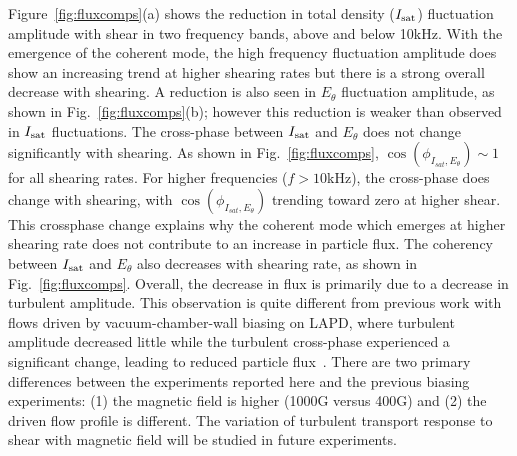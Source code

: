 \documentclass[aps,prl,amsmath,amssymb,preprint,superscriptaddress]{revtex4}
\begin{document}
Figure~\ref{fig:fluxcomps}(a) shows the reduction in total density ($I_{\rm
  sat}$) fluctuation amplitude with shear in two frequency bands,
above and below 10kHz.  With the emergence of the coherent mode, the
high frequency fluctuation amplitude does show an increasing trend at higher shearing
rates but there is a strong overall decrease with shearing.
A reduction is also seen in $E_\theta$ fluctuation amplitude, as shown in
Fig.~\ref{fig:fluxcomps}(b); however this reduction is weaker than
observed in $I_{\rm sat}$ fluctuations.  The cross-phase between
$I_{\rm sat}$ and $E_\theta$ does not change significantly with
shearing. As shown in Fig.~\ref{fig:fluxcomps},
$\cos(\phi_{I_{sat},E_\theta}) \sim 1$ for all shearing rates.  For
higher frequencies ($f > 10$kHz), the cross-phase does change with
shearing, with $\cos(\phi_{I_{sat},E_\theta})$ trending toward zero at
higher shear.  This crossphase change explains why the coherent mode
which emerges at higher shearing rate does not contribute to an
increase in particle flux.  The coherency between $I_{\rm sat}$ and
$E_\theta$ also decreases with shearing rate, as shown in 
Fig.~\ref{fig:fluxcomps}.  Overall, the decrease in flux is primarily
due to a decrease in turbulent amplitude.  This observation is quite
different from previous work with flows driven by vacuum-chamber-wall
biasing on LAPD, where turbulent amplitude decreased little while the
turbulent cross-phase experienced a significant change, leading to
reduced particle flux~\cite{carter2009}.  There are two primary
differences between the experiments reported here and the previous
biasing experiments:  (1) the magnetic field is higher (1000G versus 400G) and
(2) the driven flow profile is different.  The variation of turbulent
transport response to shear with magnetic field will be studied in
future experiments.


\end{document}
